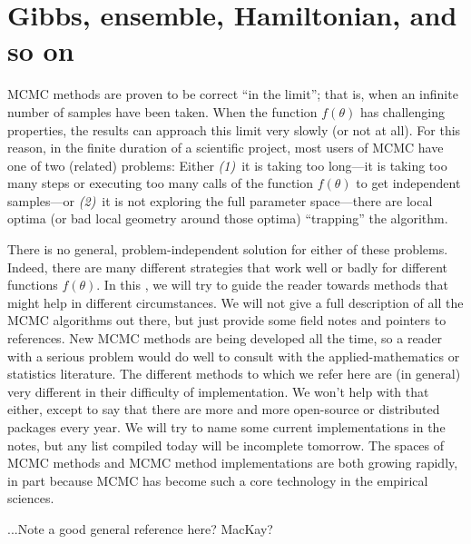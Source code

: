 \documentclass[12pt,twoside,pdftex]{article}
\newcommand{\pars}{\theta}
\begin{document}
\section{Gibbs, ensemble, Hamiltonian, and so on}\label{sec:methods}

MCMC methods are proven to be correct ``in the limit''; that is, when
an infinite number of samples have been taken.
When the function $f(\pars)$ has challenging properties, the results
can approach this limit very slowly (or not at all).
For this reason, in the finite duration of a scientific project, most
users of MCMC have one of two (related) problems:
Either \textsl{(1)}~it is taking too long---it is taking too many steps or
executing too many calls of the function $f(\pars)$ to get independent samples---or \textsl{(2)}~it is not
exploring the full parameter space---there are local optima (or bad
local geometry around those optima) ``trapping'' the algorithm.

There is no general, problem-independent solution for either of these
problems.
Indeed, there are many different strategies that work well or badly
for different functions $f(\pars)$.
In this \sectionname, we will try to guide the reader towards methods
that might help in different circumstances.
We will not give a full description of all the MCMC algorithms out
there, but just provide some field notes and pointers to references.
New MCMC methods are being developed all the time, so a reader with a
serious problem would do well to consult with the applied-mathematics
or statistics literature.
The different methods to which we refer here are (in general) very
different in their difficulty of implementation.
We won't help with that either, except to say that there are more and
more open-source or distributed packages every year.
We will try to name some current implementations in the notes, but any
list compiled today will be incomplete tomorrow.
The spaces of MCMC methods and MCMC method implementations are both
growing rapidly, in part because MCMC has become such a core
technology in the empirical sciences.

...Note a good general reference here?  MacKay?

%
%
\end{document}
